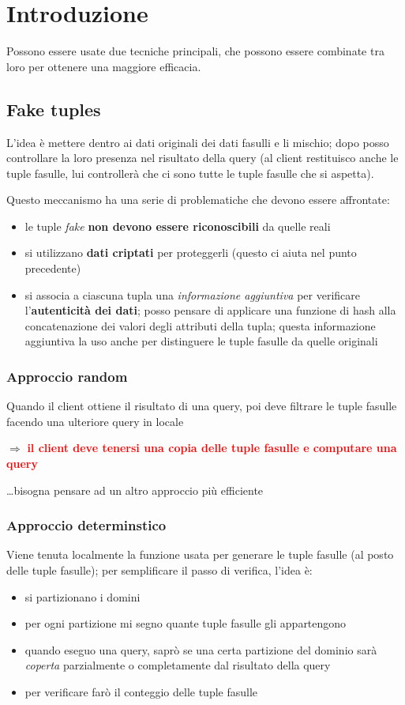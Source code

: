 \documentclass{report}
\begin{document}
\section{Introduzione}
Possono essere usate due tecniche principali, che possono essere combinate tra loro 
per ottenere una maggiore efficacia.

\subsection{Fake tuples}
L'idea è mettere dentro ai dati originali dei dati fasulli e li mischio; dopo posso controllare 
la loro presenza nel risultato della query (al client restituisco anche le tuple fasulle, lui 
controllerà che ci sono tutte le tuple fasulle che si aspetta).

\noindent Questo meccanismo ha una serie di problematiche che devono essere affrontate:
\begin{itemize}
    \item le tuple \textit{fake} \textbf{non devono essere riconoscibili} da quelle reali 
    \item si utilizzano \textbf{dati criptati} per proteggerli (questo ci aiuta nel punto precedente)
    \item si associa a ciascuna tupla una \textit{informazione aggiuntiva} per verificare l'\textbf{autenticità dei dati}; posso 
    pensare di applicare una funzione di hash alla concatenazione dei valori degli attributi della tupla; questa informazione aggiuntiva 
    la uso anche per distinguere le tuple fasulle da quelle originali
\end{itemize}

\subsubsection{Approccio random}
Quando il client ottiene il risultato di una query, poi deve filtrare le tuple fasulle facendo una 
ulteriore query in locale

$\Rightarrow$ \textcolor{red}{\textbf{il client deve tenersi una copia delle tuple fasulle e computare una query}}

\noindent\dots bisogna pensare ad un altro approccio più efficiente

\subsubsection{Approccio determinstico}
Viene tenuta localmente la funzione usata per generare le tuple fasulle (al posto delle tuple 
fasulle); per semplificare il passo di verifica, l'idea è:
\begin{itemize}
    \item si partizionano i domini
    \item per ogni partizione mi segno quante tuple fasulle gli appartengono 
    \item quando eseguo una query, saprò se una certa partizione del dominio sarà \textit{coperta} parzialmente o completamente dal risultato della query
    \item per verificare farò il conteggio delle tuple fasulle 
\end{itemize}
\end{document}
